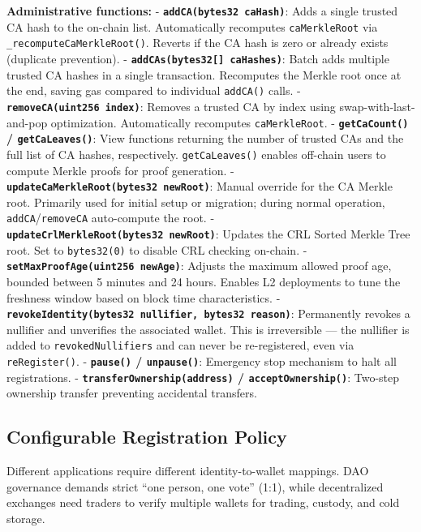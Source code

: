 \documentclass[11pt, a4paper]{article}
\begin{document}
\textbf{Administrative functions:} -
\textbf{\texttt{addCA(bytes32\ caHash)}}: Adds a single trusted CA hash
to the on-chain list. Automatically recomputes \texttt{caMerkleRoot} via
\texttt{\_recomputeCaMerkleRoot()}. Reverts if the CA hash is zero or
already exists (duplicate prevention). -
\textbf{\texttt{addCAs(bytes32{[}{]}\ caHashes)}}: Batch adds multiple
trusted CA hashes in a single transaction. Recomputes the Merkle root
once at the end, saving gas compared to individual \texttt{addCA()}
calls. - \textbf{\texttt{removeCA(uint256\ index)}}: Removes a trusted
CA by index using swap-with-last-and-pop optimization. Automatically
recomputes \texttt{caMerkleRoot}. - \textbf{\texttt{getCaCount()} /
\texttt{getCaLeaves()}}: View functions returning the number of trusted
CAs and the full list of CA hashes, respectively. \texttt{getCaLeaves()}
enables off-chain users to compute Merkle proofs for proof generation. -
\textbf{\texttt{updateCaMerkleRoot(bytes32\ newRoot)}}: Manual override
for the CA Merkle root. Primarily used for initial setup or migration;
during normal operation, \texttt{addCA}/\texttt{removeCA} auto-compute
the root. - \textbf{\texttt{updateCrlMerkleRoot(bytes32\ newRoot)}}:
Updates the CRL Sorted Merkle Tree root. Set to \texttt{bytes32(0)} to
disable CRL checking on-chain. -
\textbf{\texttt{setMaxProofAge(uint256\ newAge)}}: Adjusts the maximum
allowed proof age, bounded between 5 minutes and 24 hours. Enables L2
deployments to tune the freshness window based on block time
characteristics. -
\textbf{\texttt{revokeIdentity(bytes32\ nullifier,\ bytes32\ reason)}}:
Permanently revokes a nullifier and unverifies the associated wallet.
This is irreversible --- the nullifier is added to
\texttt{revokedNullifiers} and can never be re-registered, even via
\texttt{reRegister()}. - \textbf{\texttt{pause()} / \texttt{unpause()}}:
Emergency stop mechanism to halt all registrations. -
\textbf{\texttt{transferOwnership(address)} /
\texttt{acceptOwnership()}}: Two-step ownership transfer preventing
accidental transfers.

\subsection{Configurable Registration
Policy}\label{configurable-registration-policy}

Different applications require different identity-to-wallet mappings.
DAO governance demands strict ``one person, one vote'' (1:1), while
decentralized exchanges need traders to verify multiple wallets for
trading, custody, and cold storage.
\end{document}

